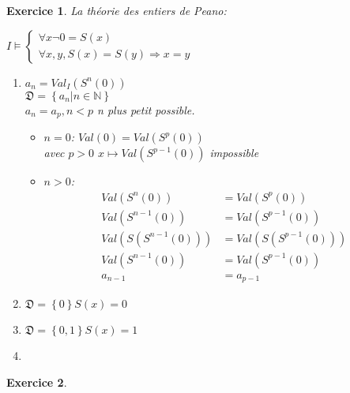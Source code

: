\documentclass{article}
\theoremstyle{plain}
\newtheorem{exo}{Exercice}%
\begin{document}
\begin{exo} La théorie des entiers de Peano: \vspace*{0.2cm}

$I \models \begin{cases}
    \forall x \neg 0 = S(x) \\
    \forall x, y, S(x) = S(y) \Rightarrow x = y
\end{cases}$
\begin{enumerate}
\item $a_n = Val_I(S^n(0))$ \\
        $\mathfrak{D} = \left\{a_n| n \in \mathbb{N}\right\}$ \\
    $a_n = a_p,  n < p$ n plus petit possible.
    \begin{itemize}
        \item $n = 0$: $Val(0) = Val(S^p(0))$ \\ avec $p > 0$
                    $x \mapsto Val(S^{p-1}(0))$ impossible
        \item $n > 0$: \begin{align*}
            Val(S^n(0)) &= Val(S^p(0)) \\
            Val(S^{n-1}(0)) &= Val(S^{p-1}(0)) \\
            Val(S(S^{n-1}(0))) &= Val(S(S^{p-1}(0))) \\
            Val(S^{n-1}(0)) &= Val(S^{p-1}(0))\\
            a_{n-1} &= a_{p-1}
        \end{align*}
    \end{itemize}
\item $\mathfrak{D} = \left\{0\right\} S(x) = 0$
\item $\mathfrak{D} = \left\{0, 1\right\} S(x) = 1$ 
\item 
\end{enumerate}
\end{exo}

\begin{exo}

\end{exo}
\end{document}
